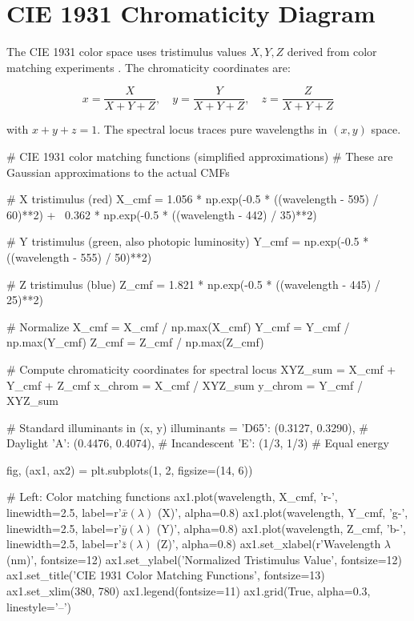 \documentclass[11pt,a4paper]{article}
\begin{document}
\section{CIE 1931 Chromaticity Diagram}

The CIE 1931 color space uses tristimulus values $X, Y, Z$ derived from color matching experiments \cite{wyszecki2000color}. The chromaticity coordinates are:

\begin{equation}
x = \frac{X}{X + Y + Z}, \quad y = \frac{Y}{X + Y + Z}, \quad z = \frac{Z}{X + Y + Z}
\end{equation}

with $x + y + z = 1$. The spectral locus traces pure wavelengths in $(x, y)$ space.

\begin{pycode}
# CIE 1931 color matching functions (simplified approximations)
# These are Gaussian approximations to the actual CMFs

# X tristimulus (red)
X_cmf = 1.056 * np.exp(-0.5 * ((wavelength - 595) / 60)**2) + \
        0.362 * np.exp(-0.5 * ((wavelength - 442) / 35)**2)

# Y tristimulus (green, also photopic luminosity)
Y_cmf = np.exp(-0.5 * ((wavelength - 555) / 50)**2)

# Z tristimulus (blue)
Z_cmf = 1.821 * np.exp(-0.5 * ((wavelength - 445) / 25)**2)

# Normalize
X_cmf = X_cmf / np.max(X_cmf)
Y_cmf = Y_cmf / np.max(Y_cmf)
Z_cmf = Z_cmf / np.max(Z_cmf)

# Compute chromaticity coordinates for spectral locus
XYZ_sum = X_cmf + Y_cmf + Z_cmf
x_chrom = X_cmf / XYZ_sum
y_chrom = Y_cmf / XYZ_sum

# Standard illuminants in (x, y)
illuminants = {
    'D65': (0.3127, 0.3290),  # Daylight
    'A': (0.4476, 0.4074),    # Incandescent
    'E': (1/3, 1/3)           # Equal energy
}

fig, (ax1, ax2) = plt.subplots(1, 2, figsize=(14, 6))

# Left: Color matching functions
ax1.plot(wavelength, X_cmf, 'r-', linewidth=2.5, label=r'$\bar{x}(\lambda)$ (X)', alpha=0.8)
ax1.plot(wavelength, Y_cmf, 'g-', linewidth=2.5, label=r'$\bar{y}(\lambda)$ (Y)', alpha=0.8)
ax1.plot(wavelength, Z_cmf, 'b-', linewidth=2.5, label=r'$\bar{z}(\lambda)$ (Z)', alpha=0.8)
ax1.set_xlabel(r'Wavelength $\lambda$ (nm)', fontsize=12)
ax1.set_ylabel('Normalized Tristimulus Value', fontsize=12)
ax1.set_title('CIE 1931 Color Matching Functions', fontsize=13)
ax1.set_xlim(380, 780)
ax1.legend(fontsize=11)
ax1.grid(True, alpha=0.3, linestyle='--')


\end{pycode}
\end{document}
